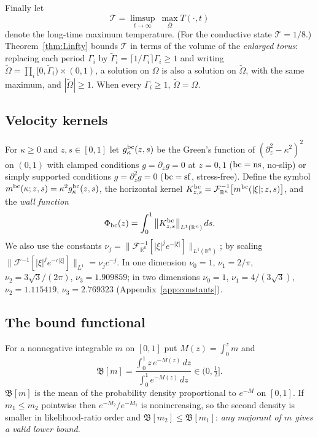 Finally let
\[
\mathcal T=\limsup_{t\to\infty}\ \max_{\overline\Omega}T(\cdot,t)
\]
denote the long-time maximum temperature. (For the conductive state $\mathcal T=1/8$.) Theorem~\ref{thm:Linfty}
bounds $\mathcal T$ in terms of the volume of the \emph{enlarged torus}: replacing each period $\Gamma_i$ by
$\tilde\Gamma_i=\lceil1/\Gamma_i\rceil\Gamma_i\ge1$ and writing $\tilde\Omega=\prod_i[0,\tilde\Gamma_i)\times(0,1)$,
a solution on $\Omega$ is also a solution on $\tilde\Omega$, with the same maximum, and $|\tilde\Omega|\ge1$.
When every $\Gamma_i\ge1$, $\tilde\Omega=\Omega$.
\subsection{Velocity kernels}
For $\kappa\ge0$ and $z,s\in[0,1]$ let $g^{\rm bc}_\kappa(z,s)$ be the Green's function of
$(\partial_z^2-\kappa^2)^2$ on $(0,1)$ with clamped conditions $g=\partial_zg=0$ at $z=0,1$
(${\rm bc}={\rm ns}$, no-slip) or simply supported conditions $g=\partial_z^2g=0$ (${\rm bc}={\rm sf}$,
stress-free). Define the symbol $m^{\rm bc}(\kappa;z,s)=\kappa^2g^{\rm bc}_\kappa(z,s)$, the horizontal
kernel $K^{\rm bc}_{z,s}=\mathcal F^{-1}_{\mathbb R^n}\big[m^{\rm bc}(|\xi|;z,s)\big]$, and the
\emph{wall function}
\begin{equation}\label{eq:Phi}
\Phi_{\rm bc}(z)=\int_0^1\big\|K^{\rm bc}_{z,s}\big\|_{L^1(\mathbb R^n)}\,ds .
\end{equation}
We also use the constants
$\nu_j=\big\|\mathcal F^{-1}_{\mathbb R^n}[|\xi|^je^{-|\xi|}]\big\|_{L^1(\mathbb R^n)}$; by scaling
$\|\mathcal F^{-1}[|\xi|^je^{-c|\xi|}]\|_{L^1}=\nu_jc^{-j}$. In one dimension
$\nu_0=1$, $\nu_1=2/\pi$, $\nu_2=3\sqrt3/(2\pi)$, $\nu_3=1.909859$; in two dimensions
$\nu_0=1$, $\nu_1=4/(3\sqrt3)$, $\nu_2=1.115419$, $\nu_3=2.769323$ (Appendix~\ref{app:constants}).

\subsection{The bound functional}
For a nonnegative integrable $m$ on $[0,1]$ put $M(z)=\int_0^zm$ and
\begin{equation}\label{eq:B}
\mathfrak B[m]=\frac{\int_0^1 z\,e^{-M(z)}\,dz}{\int_0^1e^{-M(z)}\,dz}\in\big(0,\tfrac12\big].
\end{equation}
$\mathfrak B[m]$ is the mean of the probability density proportional to $e^{-M}$ on $[0,1]$. If
$m_1\le m_2$ pointwise then $e^{-M_2}/e^{-M_1}$ is nonincreasing, so the second density is smaller in
likelihood-ratio order and $\mathfrak B[m_2]\le\mathfrak B[m_1]$: \emph{any majorant of $m$ gives a valid
lower bound.}

